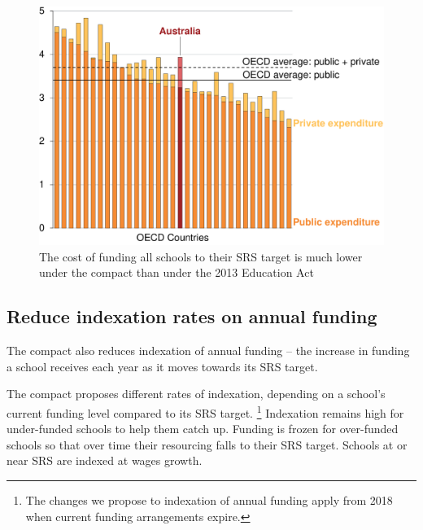 \documentclass{grattan}
\begin{document}
\begin{figure}
\caption{The cost of funding all schools to their SRS target is much lower under the compact than under the 2013 Education Act}\label{fig:cost-funding-all-schools-to-target-SRS-reduced-under-compact}


\includegraphics[page=15]{atlas/Charts.pdf}

\end{figure}


\subsection{Reduce indexation rates on annual funding}\label{subsec:ii-reduce-indexation-rates-on-annual-funding}

The compact also reduces indexation of annual funding -- the increase in funding a school receives each year as it moves towards its SRS target.

The compact proposes different rates of indexation, depending on a school's current funding level compared to its SRS target.%
\footnote{The changes we propose to indexation of annual funding apply from 2018 when current funding arrangements expire.} Indexation remains high for under-funded schools to help them catch up. Funding is frozen for over-funded schools so that over time their resourcing falls to their SRS target. Schools at or near SRS are indexed at wages growth.
\end{document}
